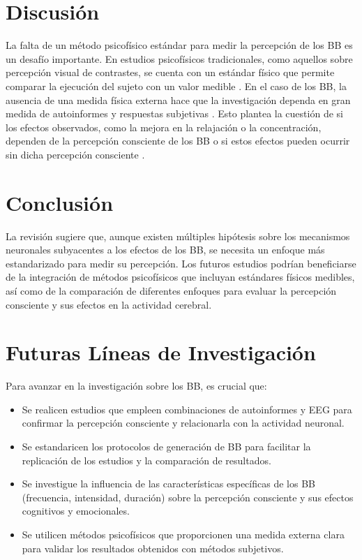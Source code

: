 \documentclass{article}
\begin{document}
\section{Discusión}
La falta de un método psicofísico estándar para medir la percepción de los BB es un desafío importante. En estudios psicofísicos tradicionales, como aquellos sobre percepción visual de contrastes, se cuenta con un estándar físico que permite comparar la ejecución del sujeto con un valor medible \citep{midbrain2024}. En el caso de los BB, la ausencia de una medida física externa hace que la investigación dependa en gran medida de autoinformes y respuestas subjetivas \citep{theta2024}. Esto plantea la cuestión de si los efectos observados, como la mejora en la relajación o la concentración, dependen de la percepción consciente de los BB o si estos efectos pueden ocurrir sin dicha percepción consciente \citep{alpha2023}.

\section{Conclusión}
La revisión sugiere que, aunque existen múltiples hipótesis sobre los mecanismos neuronales subyacentes a los efectos de los BB, se necesita un enfoque más estandarizado para medir su percepción. Los futuros estudios podrían beneficiarse de la integración de métodos psicofísicos que incluyan estándares físicos medibles, así como de la comparación de diferentes enfoques para evaluar la percepción consciente y sus efectos en la actividad cerebral.

\section{Futuras Líneas de Investigación}
Para avanzar en la investigación sobre los BB, es crucial que:
\begin{itemize}
  \item Se realicen estudios que empleen combinaciones de autoinformes y EEG para confirmar la percepción consciente y relacionarla con la actividad neuronal.
  \item Se estandaricen los protocolos de generación de BB para facilitar la replicación de los estudios y la comparación de resultados.
  \item Se investigue la influencia de las características específicas de los BB (frecuencia, intensidad, duración) sobre la percepción consciente y sus efectos cognitivos y emocionales.
  \item Se utilicen métodos psicofísicos que proporcionen una medida externa clara para validar los resultados obtenidos con métodos subjetivos.
\end{itemize}
\end{document}
